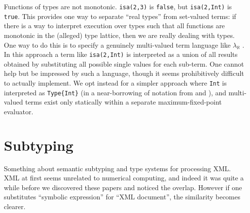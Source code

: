 Functions of types are not monotonic. \texttt{isa(2,3)} is \texttt{false},
but \texttt{isa(2,Int)} is \texttt{true}.
This provides one way to separate ``real types'' from set-valued terms:
if there is a way to interpret execution over types such that all functions
are monotonic in the (alleged) type lattice, then we are really dealing
with types.
One way to do this is to specify a genuinely multi-valued term language
like $\lambda_\aleph$ \cite{Glew:2013:MLD:2502409.2502412}.
In this approach a term like \texttt{isa(2,Int)} is interpreted as a
union of all results obtained by substituting all possible single values
for each sub-term. One cannot help but be impressed by such a language,
though it seems prohibitively difficult to actually implement.
We opt instead for a simpler approach where \texttt{Int} is
interpreted as \texttt{Type\{Int\}} (in a near-borrowing of notation from
\cite{Glew:2013:MLD:2502409.2502412} and \cite{cardelli1986polymorphic}),
and multi-valued terms exist only statically within a separate
maximum-fixed-point evaluator.

\section{Subtyping}

Something about semantic subtyping and type systems for processing XML.
XML at first seems unrelated to numerical computing, and indeed it
was quite a while before we discovered these papers and noticed the
overlap. However if one substitutes ``symbolic expression'' for
``XML document'', the similarity becomes clearer.










